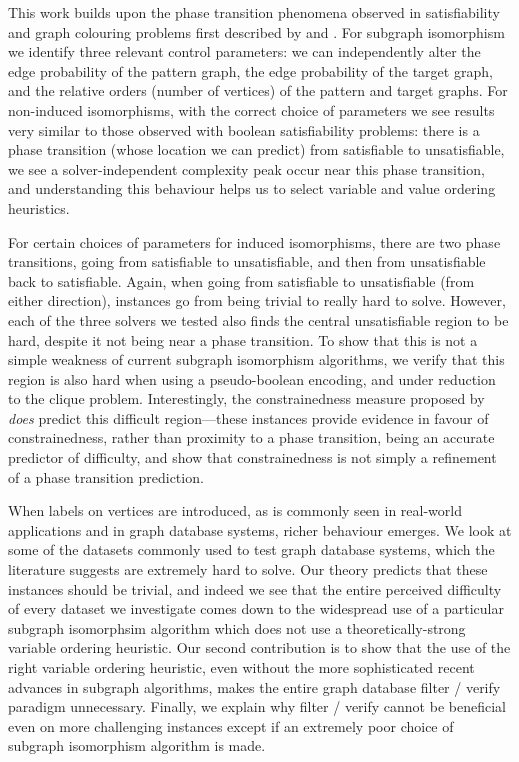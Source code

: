 \documentclass[twoside,11pt]{article}
\newcommand{\citet}[1]{\citeA{#1}}
\begin{document}
This work builds upon the phase transition phenomena observed in satisfiability and graph colouring
problems first described by \citet{DBLP:conf/ijcai/CheesemanKT91} and \citet{Mitchell:1992}.  For
subgraph isomorphism we identify three relevant control parameters: we can independently alter the
edge probability of the pattern graph, the edge probability of the target graph, and the relative
orders (number of vertices) of the pattern and target graphs.  For non-induced isomorphisms, with
the correct choice of parameters we see results very similar to those observed with boolean
satisfiability problems: there is a phase transition (whose location we can predict) from
satisfiable to unsatisfiable, we see a solver-independent complexity peak occur near this phase
transition, and understanding this behaviour helps us to select variable and value ordering
heuristics.

For certain choices of parameters for induced isomorphisms, there are two phase transitions, going
from satisfiable to unsatisfiable, and then from unsatisfiable back to satisfiable. Again, when
going from satisfiable to unsatisfiable (from either direction), instances go from being trivial to
really hard to solve. However, each of the three solvers we tested also finds the central
unsatisfiable region to be hard, despite it not being near a phase transition. To show that this is
not a simple weakness of current subgraph isomorphism algorithms, we verify that this region is also
hard when using a pseudo-boolean encoding, and under reduction to the clique problem. Interestingly,
the constrainedness measure proposed by \citet{Gent:1996:Kappa} \emph{does} predict this difficult
region---these instances provide evidence in favour of constrainedness, rather than proximity to a
phase transition, being an accurate predictor of difficulty, and show that constrainedness is not
simply a refinement of a phase transition prediction.

When labels on vertices are introduced, as is commonly seen in real-world applications and in graph
database systems, richer behaviour emerges. We look at some of the datasets commonly used to test
graph database systems, which the literature suggests are extremely hard to solve. Our theory
predicts that these instances should be trivial, and indeed we see that the entire perceived
difficulty of every dataset we investigate comes down to the widespread use of a particular subgraph
isomorphsim algorithm which does not use a theoretically-strong variable ordering heuristic. Our
second contribution is to show that the use of the right variable ordering heuristic, even without
the more sophisticated recent advances in subgraph algorithms, makes the entire graph database
filter / verify paradigm unnecessary.  Finally, we explain why filter / verify cannot be beneficial
even on more challenging instances except if an extremely poor choice of subgraph isomorphism
algorithm is made.
\end{document}
